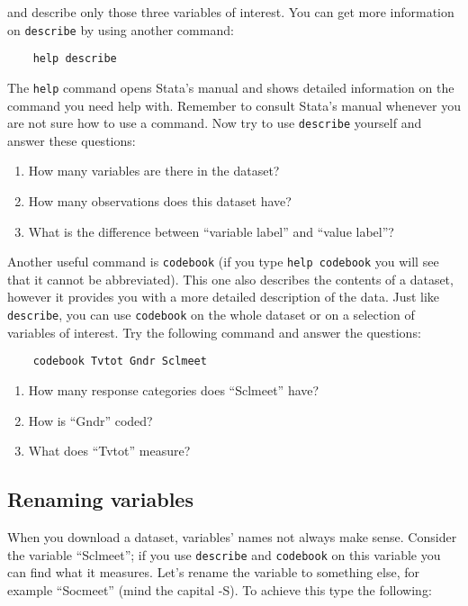 and describe only those three variables of interest. You can get more information on \texttt{describe} by using another command:

\begin{lstlisting}
	help describe
\end{lstlisting}

The \texttt{help} command opens Stata's manual and shows detailed information on the command you need help with. Remember to consult Stata's manual whenever you are not sure how to use a command. Now try to use \texttt{describe} yourself and answer these questions:

\begin{enumerate}
	\item How many variables are there in the dataset?
	\item How many observations does this dataset have?
	\item What is the difference between ``variable label'' and ``value label''?
\end{enumerate}

Another useful command is \texttt{codebook} (if you type \texttt{help codebook} you will see that it cannot be abbreviated). This one also describes the contents of a dataset, however it provides you with a more detailed description of the data. Just like \texttt{describe}, you can use \texttt{codebook} on the whole dataset or on a selection of variables of interest. Try the following command and answer the questions:

\begin{lstlisting}
	codebook Tvtot Gndr Sclmeet
\end{lstlisting}

\begin{enumerate}
	\item How many response categories does ``Sclmeet'' have?
	\item How is ``Gndr'' coded?
	\item What does ``Tvtot'' measure?
\end{enumerate}

\subsection*{Renaming variables}

When you download a dataset, variables' names not always make sense. Consider the variable ``Sclmeet''; if you use \texttt{describe} and \texttt{codebook} on this variable you can find what it measures. Let's rename the variable to something else, for example ``Socmeet'' (mind the capital -S). To achieve this type the following:


